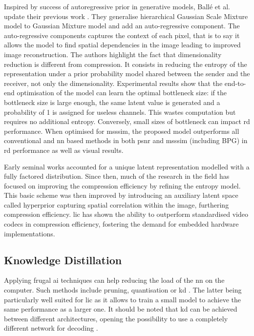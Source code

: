 \documentclass{article}
\begin{document}
Inspired by success of autoregressive prior in generative models, Ballé et al. update their previous work \cite{minnen2018jointautoregressivehierarchicalpriors}. They generalise hierarchical Gaussian Scale Mixture model to Gaussian Mixture model and add an auto-regressive component. The auto-regressive components captures the context of each pixel, that is to say it allows the model to find spatial dependencies in the image leading to improved image reconstruction. The authors highlight the fact that dimensionality reduction is different from compression. It consists in reducing the entropy of the representation under a prior probability model shared between the sender and the receiver, not only the dimensionality. Experimental results show that the end-to-end optimisation of the model can learn the optimal bottleneck size: if the bottleneck size is large enough, the same latent value is generated and a probability of 1 is assigned for useless channels. This wastes computation but requires no additional entropy. Conversely, small sizes of bottleneck can impact \acrshort{rd} performance. When optimised for \acrshort{msssim}, the proposed model outperforms all conventional and \acrshort{nn} based methods in both \acrshort{psnr} and \acrshort{msssim} (including BPG) in \acrshort{rd} performance as well as visual results.

Early seminal works accounted for a unique latent representation modelled with a fully factored distribution. Since then, much of the research in the field has focused on improving the compression efficiency by refining the entropy model. This basic scheme was then improved by introducing an auxiliary latent space called hyperprior capturing spatial correlation within the image, furthering compression efficiency. \acrshort{lic} has shown the ability to outperform standardised video codecs in compression efficiency, fostering the demand for embedded hardware implementations.

\subsection{Knowledge Distillation}
Applying frugal \acrshort{ai} techniques can help reducing the load of the \acrshort{nn} on the computer. Such methods include pruning, quantisation or \acrfull{kd} \cite{touvron2021trainingdataefficientimagetransformers}. The latter being particularly well suited for \acrshort{lic} as it allows to train a small model to achieve the same performance as a larger one. It should be noted that \acrshort{kd} can be achieved between different architectures, opening the possibility to use a completely different network for decoding \cite{liu2022crossarchitectureknowledgedistillation}.
\end{document}
